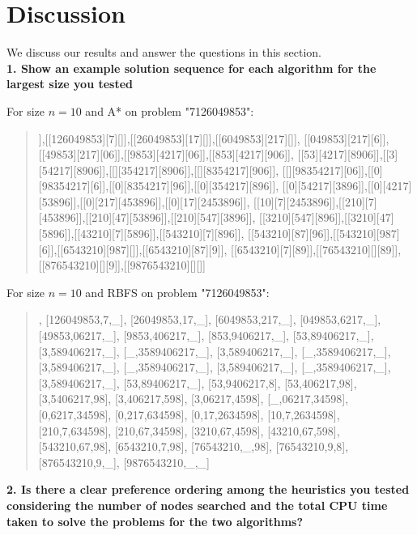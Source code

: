 \section{Discussion}\label{sec:dis}

We discuss our results and answer the questions in this section.\\

\textbf{1. Show an example solution sequence for each algorithm for the largest size you tested}

For size $n = 10$ and A* on problem "7126049853":

\begin{quote}
\noindent
[[7126049853][][]],[[126049853][7][]],[[26049853][17][]],[[6049853][217][]],
[[049853][217][6]],[[49853][217][06]],[[9853][4217][06]],[[853][4217][906]],
[[53][4217][8906]],[[3][54217][8906]],[[][354217][8906]],[[][8354217][906]],
[[][98354217][06]],[[0][98354217][6]],[[0][8354217][96]],[[0][354217][896]],
[[0][54217][3896]],[[0][4217][53896]],[[0][217][453896]],[[0][17][2453896]],
[[10][7][2453896]],[[210][7][453896]],[[210][47][53896]],[[210][547][3896]],
[[3210][547][896]],[[3210][47][5896]],[[43210][7][5896]],[[543210][7][896]],
[[543210][87][96]],[[543210][987][6]],[[6543210][987][]],[[6543210][87][9]],
[[6543210][7][89]],[[76543210][][89]],[[876543210][][9]],[[9876543210][][]]
\end{quote}

For size $n = 10$ and RBFS on problem "7126049853":

\begin{quote}
\noindent
[7126049853,\_,\_], [126049853,7,\_], [26049853,17,\_], [6049853,217,\_], 
[049853,6217,\_], [49853,06217,\_], [9853,406217,\_], [853,9406217,\_], 
[53,89406217,\_], [3,589406217,\_], [\_,3589406217,\_], [3,589406217,\_], 
[\_,3589406217,\_], [3,589406217,\_], [\_,3589406217,\_], [3,589406217,\_], 
[\_,3589406217,\_], [3,589406217,\_], [53,89406217,\_], [53,9406217,8], 
[53,406217,98], [3,5406217,98], [3,406217,598], [3,06217,4598], 
[\_,06217,34598], [0,6217,34598], [0,217,634598], [0,17,2634598], 
[10,7,2634598], [210,7,634598], [210,67,34598], [3210,67,4598], 
[43210,67,598], [543210,67,98], [6543210,7,98], [76543210,\_,98], 
[76543210,9,8], [876543210,9,\_], [9876543210,\_,\_] 
\end{quote}

\textbf{2. Is there a clear preference ordering among the heuristics you tested considering the number of nodes searched and the total CPU time taken to solve the problems for the two algorithms?}

